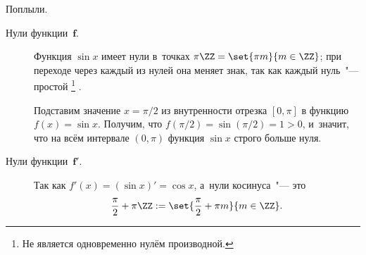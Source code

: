 \begin{solution}
\begin{enumerate}[1.]
			Поплыли.
			\begin{description}
				\item[Нули функции~$\bm{f}$.] 
					Функция $\sin{x}$ имеет нули в~точках $\pi \ZZ = \set{\pi m}{m \in
					\ZZ}$; при переходе через каждый из нулей она меняет знак, так как
					каждый нуль~"--- простой%
					\footnote{Не является одновременно нулём производной.}%
					.

					Подставим значение $x = \pi/2$ из внутренности отрезка $[0, \pi]$ в
					функцию $f(x) = \sin{x}$. Получим, что $f(\pi/2) = \sin(\pi/2) = 1 >
					0$, и~значит, что на всём интервале $(0, \pi)$ функция $\sin{x}$
					строго больше нуля.

				\item[Нули функции~$\bm{f'}$.]

					Так как $f'(x) = (\sin{x})' = \cos{x}$, а~нули косинуса~"--- это
					\[
						\frac{\pi}{2} + \pi\ZZ :=
						\set{\frac{\pi}{2} + \pi m}{m \in \ZZ}
						.
					\]
			\end{description}
	\end{enumerate}
\end{solution}
